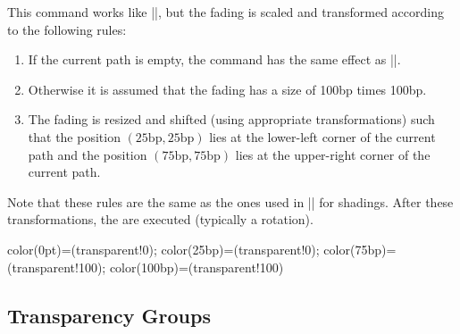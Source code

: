 \begin{command}{\pgfsetfadingforcurrentpath{}}
  This command works like |\pgfsetfading|, but the fading is scaled
  and transformed according to the following rules:
  \begin{enumerate}
  \item
    If the current path is empty, the command has the same effect as
    |\pgfsetfading|.
  \item
    Otherwise it is assumed that the fading has a size of 100bp times
    100bp.
  \item
    The fading is resized and shifted (using appropriate
    transformations) such that the position
    $(25\mathrm{bp},25\mathrm{bp})$ lies at the lower-left corner of
    the current path and the position $(75\mathrm{bp},75\mathrm{bp})$
    lies at the upper-right corner of the current path.
  \end{enumerate}
  Note that these rules are the same as the ones used in
  |\pgfshadepath| for shadings. After these transformations, the
   are executed (typically a rotation).
\begin{codeexample}[]
{ color(0pt)=(transparent!0);    color(25bp)=(transparent!0);
  color(75bp)=(transparent!100); color(100bp)=(transparent!100)}


\end{codeexample}

\end{command}

\subsection{Transparency Groups}

